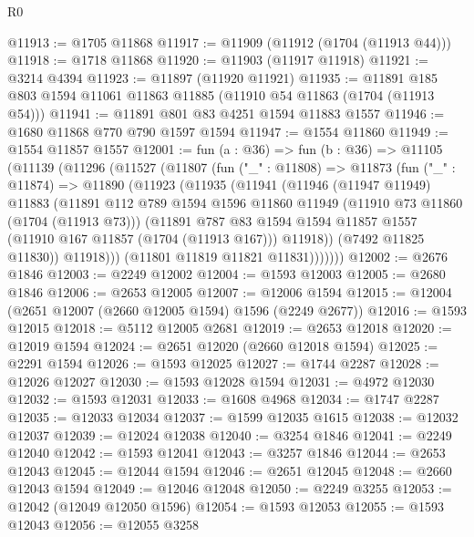 \begin{lexlean}{R0}
\begin{coremodule}
@11913 := @1705 @11868
@11917 := @11909 (@11912 (@1704 (@11913 @44)))
@11918 := @1718 @11868
@11920 := @11903 (@11917 @11918)
@11921 := @3214 @4394
@11923 := @11897 (@11920 @11921)
@11935 := @11891 @185 @803 @1594 @11061 @11863 @11885 (@11910 @54 @11863 (@1704 (@11913 @54)))
@11941 := @11891 @801 @83 @4251 @1594 @11883 @1557
@11946 := @1680 @11868 @770 @790 @1597 @1594
@11947 := @1554 @11860
@11949 := @1554 @11857 @1557
@12001 := fun (a : @36) =>
  fun (b : @36) =>
  @11105
    (@11139
      (@11296
        (@11527
          (@11807
            (fun ("_" : @11808) =>
            @11873
              (fun ("_" : @11874) =>
              @11890
                (@11923
                  (@11935
                    (@11941
                      (@11946
                        (@11947 @11949)
                        @11883
                        (@11891
                          @112
                          @789
                          @1594
                          @1596
                          @11860
                          @11949
                          (@11910 @73 @11860 (@1704 (@11913 @73)))
                          (@11891
                            @787
                            @83
                            @1594
                            @1594
                            @11857
                            @1557
                            (@11910 @167 @11857 (@1704 (@11913 @167)))
                            @11918))
                        (@7492 @11825 @11830))
                      @11918)))
                (@11801 @11819 @11821 @11831)))))))
@12002 := @2676 @1846
@12003 := @2249 @12002
@12004 := @1593 @12003
@12005 := @2680 @1846
@12006 := @2653 @12005
@12007 := @12006 @1594
@12015 := @12004 (@2651 @12007 (@2660 @12005 @1594) @1596 (@2249 @2677))
@12016 := @1593 @12015
@12018 := @5112 @12005 @2681
@12019 := @2653 @12018
@12020 := @12019 @1594
@12024 := @2651 @12020 (@2660 @12018 @1594)
@12025 := @2291 @1594
@12026 := @1593 @12025
@12027 := @1744 @2287
@12028 := @12026 @12027
@12030 := @1593 @12028 @1594
@12031 := @4972 @12030
@12032 := @1593 @12031
@12033 := @1608 @4968
@12034 := @1747 @2287
@12035 := @12033 @12034
@12037 := @1599 @12035 @1615
@12038 := @12032 @12037
@12039 := @12024 @12038
@12040 := @3254 @1846
@12041 := @2249 @12040
@12042 := @1593 @12041
@12043 := @3257 @1846
@12044 := @2653 @12043
@12045 := @12044 @1594
@12046 := @2651 @12045
@12048 := @2660 @12043 @1594
@12049 := @12046 @12048
@12050 := @2249 @3255
@12053 := @12042 (@12049 @12050 @1596)
@12054 := @1593 @12053
@12055 := @1593 @12043
@12056 := @12055 @3258

\end{coremodule}
\end{lexlean}
